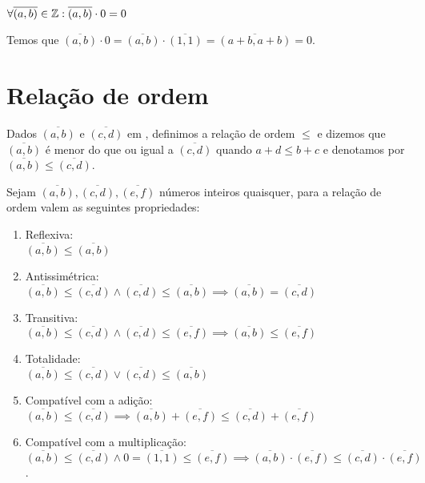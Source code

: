 \documentclass[../main.tex]{subfiles}
\begin{document}
\begin{lema}
    $\forall \overline{(a,b)} \in \mathbb{Z} : \overline{(a,b)} \cdot 0 = 0$
\end{lema}
\begin{dem}
    Temos que $\overline{(a,b)} \cdot 0 = \overline{(a,b)} \cdot \overline{(1,1)} = \overline{(a+b,a+b)} = 0$.
\end{dem}

\section{Relação de ordem}
\begin{defi}
    Dados $\overline{(a,b)}$ e $\overline{(c,d)}$ em \Z, definimos a relação de ordem $\leq$ e dizemos que $\overline{(a,b)}$ é menor do que ou igual a $\overline{(c,d)}$ quando $a+d \leq b+c$ e denotamos por $\overline{(a,b)} \leq \overline{(c,d)}$.
\end{defi}
\begin{prop}{Sejam $\overline{(a,b)}, \overline{(c,d)}, \overline{(e,f)}$ números inteiros quaisquer, para a relação de ordem valem as seguintes propriedades:}
    \begin{enumerate}[label=(\roman*)]
        \item Reflexiva: \\
        $\overline{(a,b)} \leq \overline{(a,b)}$
        
        \item Antissimétrica: \\
        $\overline{(a,b)}  \leq \overline{(c,d)} \land \overline{(c,d)} \leq \overline{(a,b)} \implies \overline{(a,b)} = \overline{(c,d)}   $
        
        \item Transitiva: \\
        $\overline{(a,b)} \leq \overline{(c,d)} \land \overline{(c,d)} \leq \overline{(e,f)} \implies \overline{(a,b)} \leq \overline{(e,f)}  $
        
        \item Totalidade: \\
        $\overline{(a,b)} \leq \overline{(c,d)} \lor \overline{(c,d)} \leq \overline{(a,b)}  $
        
        \item Compatível com a adição: \\
        $\overline{(a,b)} \leq \overline{(c,d)} \implies \overline{(a,b)} + \overline{(e,f)} \leq \overline{(c,d)} + \overline{(e,f)}$
        
        \item Compatível com a multiplicação:\\
        $\overline{(a,b)} \leq \overline{(c,d)} \land 0 = \overline{(1,1)} \leq \overline{(e,f)} \implies \overline{(a,b)} \cdot \overline{(e,f)} \leq \overline{(c,d)} \cdot \overline{(e,f)}$.
        
    \end{enumerate}
\end{prop}
\end{document}
